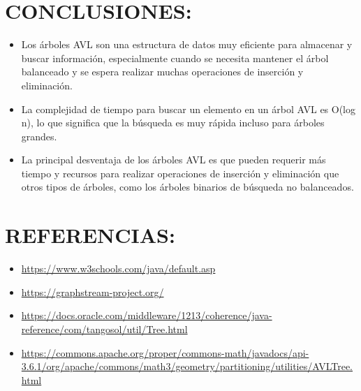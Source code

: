 \documentclass{article}
\begin{document}
        \section{CONCLUSIONES:}
            \begin{itemize}
                \item Los árboles AVL son una estructura de datos muy eficiente para almacenar y buscar información, especialmente cuando se necesita mantener el árbol balanceado y se espera realizar muchas operaciones de inserción y eliminación.
                \item La complejidad de tiempo para buscar un elemento en un árbol AVL es O(log n), lo que significa que la búsqueda es muy rápida incluso para árboles grandes.
                \item La principal desventaja de los árboles AVL es que pueden requerir más tiempo y recursos para realizar operaciones de inserción y eliminación que otros tipos de árboles, como los árboles binarios de búsqueda no balanceados.
            \end{itemize}
        \clearpage
        \section{REFERENCIAS:}
            \begin{itemize}			
                \item \url{https://www.w3schools.com/java/default.asp}
                \item \url{https://graphstream-project.org/}
                \item \url{https://docs.oracle.com/middleware/1213/coherence/java-reference/com/tangosol/util/Tree.html}
                \item \url{https://commons.apache.org/proper/commons-math/javadocs/api-3.6.1/org/apache/commons/math3/geometry/partitioning/utilities/AVLTree.html}
            \end{itemize}	
        	
        			
\end{document}
